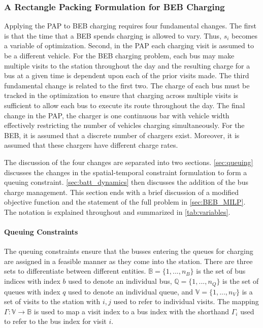 \documentclass[ee,msthesis]{usuthesis}
\begin{document}
\subsubsection{A Rectangle Packing Formulation for BEB Charging}
\label{sec:problemformulation}
Applying the PAP to BEB charging requires four fundamental changes. The first is that the time that a BEB spends
charging is allowed to vary. Thus, \(s_i\) becomes a variable of optimization. Second, in the PAP each charging visit is
assumed to be a different vehicle. For the BEB charging problem, each bus may make multiple visits to the station
throughout the day and the resulting charge for a bus at a given time is dependent upon each of the prior visits made.
The third fundamental change is related to the first two. The charge of each bus must be tracked in
the optimization to ensure that charging across multiple visits is sufficient to allow each bus to execute its route throughout the day.
The final change in the PAP, the charger is one continuous bar with vehicle width effectively restricting the number of vehicles
charging simultaneously. For the BEB, it is assumed that a discrete number of chargers exist. Moreover, it is assumed
that these chargers have different charge rates.

The discussion of the four changes are separated into two sections. \autoref{sec:queuing} discusses the changes in the
spatial-temporal constraint formulation to form a queuing constraint. \autoref{sec:batt_dynamics} then discusses the
addition of the bus charge management. This section ends with a brief discussion of a modified objective function and
the statement of the full problem in \autoref{sec:BEB_MILP}. The notation is explained throughout and summarized in
\autoref{tab:variables}.

\paragraph{Queuing Constraints}
\label{sec:queuing}
\noindent
The queuing constraints ensure that the busses entering the queues for charging are assigned in a feasible manner as
they come into the station. There are three sets to differentiate between different entities. \(\mathbb{B} = \{1, ...,
n_B\}\) is the set of bus indices with index \(b\) used to denote an individual bus, \(\mathbb{Q} = \{1, ..., n_Q\}\) is the set of
queues with index \(q\) used to denote an individual queue, and \(\mathbb{V} = \{1, ..., n_V\}\) is a set of visits to the
station with \(i,j\) used to refer to individual visits. The mapping \(\Gamma: \mathbb{V} \rightarrow \mathbb{B}\) is used to map a visit
index to a bus index with the shorthand \(\Gamma_i\) used to refer to the bus index for visit \(i\).
\end{document}
